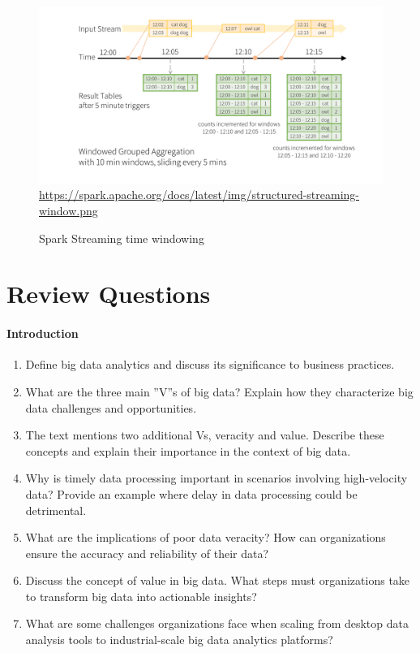 \begin{figure}
\centering
\includegraphics[width=\textwidth]{structured-streaming-window.png} \\

\scriptsize\url{https://spark.apache.org/docs/latest/img/structured-streaming-window.png}
\caption{Spark Streaming time windowing}
\label{fig:streamingtimewindow}
\end{figure}

\FloatBarrier
\section{Review Questions}
\paragraph*{Introduction}
\begin{enumerate}[nosep]
    \item Define big data analytics and discuss its significance to business practices.
    \item What are the three main ''V''s of big data? Explain how they characterize big data challenges and opportunities.
	\item The text mentions two additional Vs, veracity and value. Describe these concepts and explain their importance in the context of big data.
	\item Why is timely data processing important in scenarios involving high-velocity data? Provide an example where delay in data processing could be detrimental.
    \item What are the implications of poor data veracity? How can organizations ensure the accuracy and reliability of their data?
    \item Discuss the concept of value in big data. What steps must organizations take to transform big data into actionable insights?
	\item What are some challenges organizations face when scaling from desktop data analysis tools to industrial-scale big data analytics platforms?
\end{enumerate}
